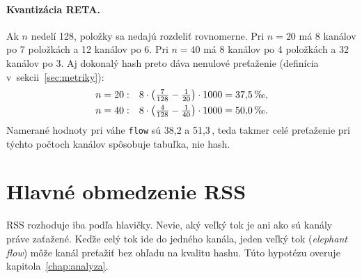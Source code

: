 \paragraph{Kvantizácia RETA.}
Ak $n$ nedelí 128, položky sa nedajú rozdeliť rovnomerne. Pri $n=20$ má 8 kanálov po
7 položkách a 12 kanálov po 6. Pri $n=40$ má 8 kanálov po 4 položkách a 32 kanálov po 3.
Aj dokonalý hash preto dáva nenulové preťaženie (definícia v~sekcii~\ref{sec:metriky}):
\begin{align}
  n=20: &\quad 8 \cdot \left(\tfrac{7}{128} - \tfrac{1}{20}\right) \cdot 1000 = 37{,}5\,\text{\textperthousand}, \\
  n=40: &\quad 8 \cdot \left(\tfrac{4}{128} - \tfrac{1}{40}\right) \cdot 1000 = 50{,}0\,\text{\textperthousand}.
\end{align}
Namerané hodnoty pri váhe \texttt{flow} sú 38,2 a 51,3\,\textperthousand, teda takmer celé
preťaženie pri týchto počtoch kanálov spôsobuje tabuľka, nie hash.

\section{Hlavné obmedzenie RSS}

RSS rozhoduje iba podľa hlavičky. Nevie, aký veľký tok je ani ako sú kanály práve
zaťažené. Keďže celý tok ide do jedného kanála, jeden veľký tok (\emph{elephant flow})
môže kanál preťažiť bez ohľadu na kvalitu hashu. Túto hypotézu overuje
kapitola~\ref{chap:analyza}.
